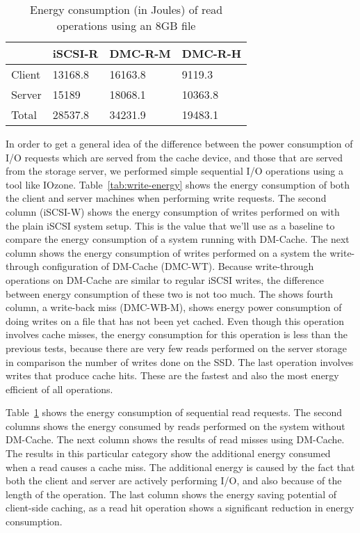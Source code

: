 \begin{table}
  \centering
  \resizebox{\linewidth}{!}
  {
    \begin{tabular}{|l|l|l|l|}
      \hline & \bf iSCSI-R & \bf DMC-R-M & \bf DMC-R-H \\ \hline
      Client & 13168.8     & 16163.8     & 9119.3      \\ \hline
      Server & 15189       & 18068.1     & 10363.8     \\ \hline
      Total  & 28537.8     & 34231.9     & 19483.1     \\ \hline
    \end{tabular}
  }
  \caption{Energy consumption (in Joules) of read operations using an 8GB file}
  \label{tab:read-energy}
\end{table}

In order to get a general idea of the difference between the power consumption
of I/O requests which are served from the cache device, and those that are
served from the storage server, we performed simple sequential I/O operations
using a tool like IOzone. Table~\ref{tab:write-energy} shows the energy
consumption of both the client and server machines when performing write
requests. The second column (iSCSI-W) shows the energy consumption of writes
performed on with the plain iSCSI system setup. This is the value that we'll use
as a baseline to compare the energy consumption of a system running with
DM-Cache. The next column shows the energy consumption of writes performed on a
system the write-through configuration of DM-Cache (DMC-WT).  Because
write-through operations on DM-Cache are similar to regular iSCSI writes, the
difference between energy consumption of these two is not too much.  The shows
fourth column, a write-back miss (DMC-WB-M), shows energy power consumption of
doing writes on a file that has not been yet cached. Even though this operation
involves cache misses, the energy consumption for this operation is less than
the previous tests, because there are very few reads performed on the server
storage in comparison the number of writes done on the SSD. The last operation
involves writes that produce cache hits. These are the fastest and also the most
energy efficient of all operations.

Table~\ref{tab:read-energy} shows the energy consumption of sequential read
requests. The second columns shows the energy consumed by reads performed on the
system without DM-Cache. The next column shows the results of read misses using
DM-Cache. The results in this particular category show the additional energy
consumed when a read causes a cache miss. The additional energy is caused by the
fact that both the client and server are actively performing I/O, and also
because of the length of the operation. The last column shows the energy saving
potential of client-side caching, as a read hit operation shows a significant
reduction in energy consumption.


